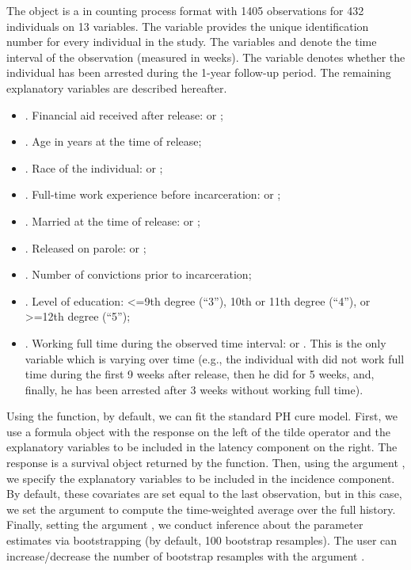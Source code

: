 The object  is a  in counting process format with 1405 observations for 432 individuals on 13 variables.
The  variable provides the unique identification number for every individual in the study. The variables  and  denote the time interval of the observation (measured in weeks). The variable  denotes whether the individual has been arrested during the 1-year follow-up period. The remaining explanatory variables are described hereafter.
\begin{itemize}
  \item {}. Financial aid received after release:  or ;
  \item {}. Age in years at the time of release;
  \item {}. Race of the individual:  or ;
  \item {}. Full-time work experience before incarceration:   or ;
  \item {}. Married at the time of release:  or ;
  \item {}. Released on parole:  or ;
  \item {}. Number of convictions prior to incarceration;
  \item {}. Level of education: <=9th degree (``3''), 10th or 11th degree (``4''), or >=12th degree (``5'');
  \item {}. Working full time during the observed time interval:  or . This is the only variable which is varying over time (e.g., the individual with  did not work full time during the first 9 weeks after release, then he did for 5 weeks, and, finally, he has been arrested after 3 weeks without working full time).
\end{itemize}

Using the  function, by default, we can fit the standard PH cure model.
First, we use a formula object with the response on the left of the tilde operator and the explanatory variables to be included in the latency component on the right.
The response is a survival object returned by the  function.
Then, using the argument , we specify the explanatory variables to be included in the incidence component.
By default, these covariates are set equal to the last observation, but in this case, we set the argument  to compute the time-weighted average over the full history.
Finally, setting the argument , we conduct inference about the parameter estimates via bootstrapping (by default, 100 bootstrap resamples). The user can increase/decrease the number of bootstrap resamples with the argument . 

